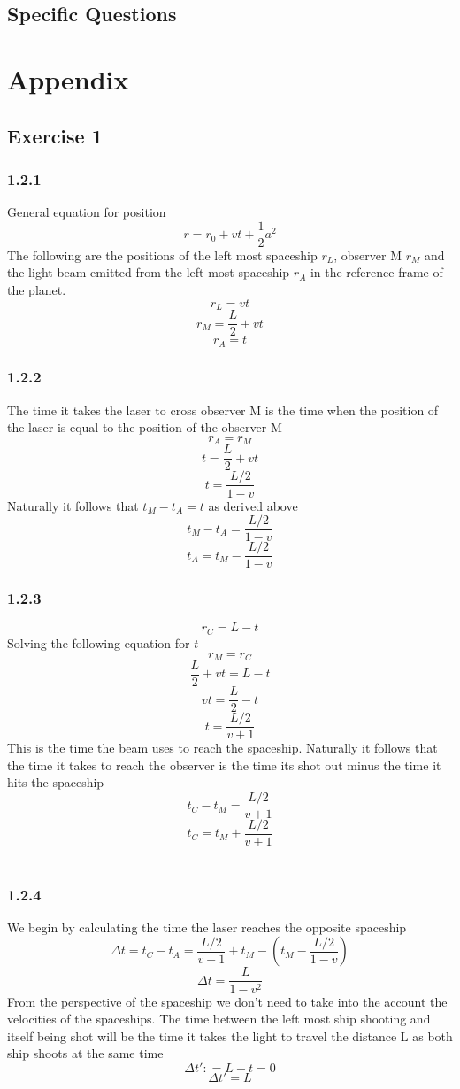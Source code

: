 \documentclass[reprint,english,notitlepage]{revtex4-2}
\begin{document}
  \subsection{Specific Questions}



\section{Appendix} \label{sec: appendix}
\subsection{Exercise 1}
\subsubsection*{1.2.1}\label{1.2.1}
General equation for position
\[
r = r_0 + vt + \frac{1}{2} a^{2}
\]
The following are the positions of the left most spaceship $ r_L $, observer M $ r_M $ and the light beam emitted from the left most spaceship $ r_A $ in the reference frame of the planet.
\[
r_L = vt
\]
\[
r_M = \frac{L}{2} + vt
\]
\[
r_A = t
\]
\subsubsection*{1.2.2}\label{1.2.2}
The time it takes the laser to cross observer M is the time when the position of the laser is equal to the position of the observer M
\[
r_A = r_M
\]
\[
t = \frac{L}{2} + vt
\]
\[
t = \frac{L / 2}{1 - v}
\]  
Naturally it follows that $ t_M - t_A = t $ as derived above
\[
t_M - t_A = \frac{L / 2}{1 - v}
\]
\[
t_A = t_M - \frac{L / 2}{1 - v}
\]


\subsubsection*{1.2.3}\label{1.2.3}
\[
r_C = L - t
\]
Solving the following equation for $ t $
\[
r_M = r_C
\]
\[
\frac{L}{2} + vt = L - t
\]
\[
vt = \frac{L}{2} - t
\]
\[
t = \frac{L / 2}{v + 1}
\]
This is the time the beam uses to reach the spaceship. Naturally it follows that the time it takes to reach the observer is the time its shot out minus the time it hits the spaceship
\[
t_C - t_M = \frac{L / 2}{v + 1}
\]  
\[
t_C = t_M + \frac{L / 2}{v + 1}
\]
\\
\subsubsection*{1.2.4}\label{1.2.4}
We begin by calculating the time the laser reaches the opposite spaceship
\[
Δt =  t_C - t_A = \frac{L / 2}{v +1} + t_M - \left( t_M - \frac{L / 2}{1 - v} \right) 
\]
\[
Δt = \frac{L}{1 - v^{2}}
\]
From the perspective of the spaceship we don't need to take into the account the velocities of the spaceships. The time between the left most ship shooting and itself being shot will be the time it takes the light to travel the distance L as both ship shoots at the same time
\[
Δt': = L - t = 0
\]
\[
Δt' = L
\]
\end{document}
